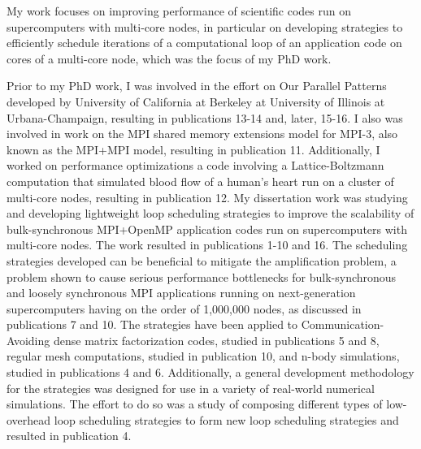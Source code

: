 My work focuses on improving performance of
scientific codes run on supercomputers with multi-core nodes, in
particular on developing strategies to efficiently schedule iterations of a 
computational loop of an application code on cores of a multi-core node, which was the focus of my PhD work. 


Prior to my PhD work, I was
involved in the effort on Our Parallel Patterns developed by
University of California at Berkeley at University of Illinois at
Urbana-Champaign, resulting in publications 13-14 and, later, 15-16. 
I also was involved in work on the MPI
shared memory extensions model for MPI-3, also known as the
MPI+MPI model, resulting in publication 11. Additionally, I worked on
performance optimizations 
a code involving a Lattice-Boltzmann computation that simulated blood flow of a human's
heart run on a cluster of multi-core nodes, resulting in publication 12. 
My dissertation work was studying and developing lightweight loop scheduling 
strategies to improve the scalability of bulk-synchronous MPI+OpenMP
application codes run on supercomputers with multi-core nodes. 
The work resulted in publications 1-10 and 16.
The scheduling strategies developed can be beneficial to mitigate the amplification
problem, a problem shown to cause serious performance bottlenecks for
bulk-synchronous and loosely synchronous MPI applications running on
next-generation supercomputers having on the order of 1,000,000 nodes,
as discussed in publications 7 and 10. The strategies have been applied to 
Communication-Avoiding dense matrix factorization codes, 
studied in publications 5 and 8,
regular mesh computations, studied in publication 10, and n-body
simulations, studied in publications 4 and 6. 
Additionally, a general development methodology for the strategies was designed
for use in a variety of real-world numerical simulations. The effort to do so
was a study of composing different types of low-overhead
loop scheduling strategies to form new loop scheduling strategies and
resulted in publication 4. 


